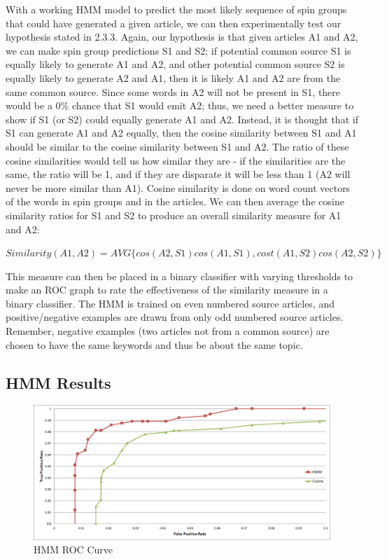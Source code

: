 \documentclass[11pt,letterpaper,oneside, titlepage]{scrartcl}
\begin{document}
With a working HMM model to predict the most likely sequence of spin groups that could have generated a given article, we can then experimentally test our hypothesis stated in 2.3.3. Again, our hypothesis is that given articles A1 and A2, we can make spin group predictions S1 and S2; if potential common source S1 is equally likely to generate A1 and A2, and other potential common source S2 is equally likely to generate A2 and A1, then it is likely A1 and A2 are from the same common source. Since some words in A2 will not be present in S1, there would be a 0\% chance that S1 would emit A2; thus, we need a better measure to show if S1 (or S2) could equally generate A1 and A2. Instead, it is thought that if S1 can generate A1 and A2 equally, then the cosine similarity between S1 and A1 should be similar to the cosine similarity between S1 and A2. The ratio of these cosine similarities would tell us how similar they are - if the similarities are the same, the ratio will be 1, and if they are disparate it will be less than 1 (A2 will never be more similar than A1). Cosine similarity is done on word count vectors of the words in spin groups and in the articles. We can then average the cosine similarity ratios for S1 and S2 to produce an overall similarity measure for A1 and A2:

$Similarity(A1, A2) = AVG\{ cos(A2, S1)cos(A1, S1) , cost(A1, S2)cos(A2, S2) \}$

This measure can then be placed in a binary classifier with varying thresholds to make an ROC graph to rate the effectiveness of the similarity measure in a binary classifier. The HMM is trained on even numbered source articles, and positive/negative examples are drawn from only odd numbered source articles. Remember, negative examples (two articles not from a common source) are chosen to have the same keywords and thus be about the same topic.

\subsection{HMM Results}

\begin{figure}[h!]
  \centering
  \includegraphics[width=1\textwidth]{hmm_ROC}
  \caption{HMM ROC Curve}
  \label{fig:hmm_ROC}
\end{figure}
\end{document}

